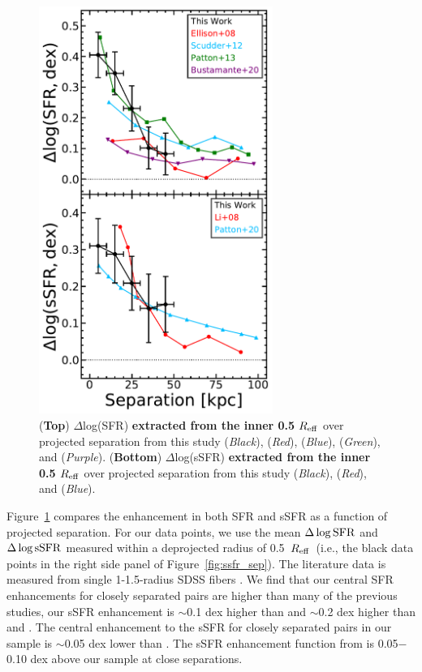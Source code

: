 \documentclass[iop,revtex4,twocolumn,apj,numberedappendix,appendixfloats]{emulateapj}
\newcommand{\reff}{$R_{\rm eff}$}
\begin{document}
\begin{figure}
\centering
\includegraphics[width=3in]{fig/nuc_sep.pdf}
\caption[]{(\textbf{Top}) $\Delta$log(SFR) \textbf{extracted from the inner 0.5 \reff} over projected separation from this study ({\it Black}), \citet{Ellison:2008} ({\it Red}), \citet{Scudder:2012} ({\it Blue}), \citet{Patton:2013} ({\it Green}), and \citet{Bustamante:2020} ({\it Purple}). (\textbf{Bottom}) $\Delta$log(sSFR) \textbf{extracted from the inner 0.5 \reff} over projected separation from this study ({\it Black}), \citet{Li:2008} ({\it Red}), and \citet{Patton:2020} ({\it Blue}).
}
\label{fig:nuc_sep}
\end{figure}

Figure~\ref{fig:nuc_sep} compares the enhancement in both SFR and sSFR as a function of projected separation. For our data points, we use the mean $\Delta\log{\rm SFR}$ and $\Delta\log{\rm sSFR}$ measured within a deprojected radius of 0.5~\reff\ (i.e., the black data points in the right side panel of Figure~\ref{fig:ssfr_sep}). The literature data is measured from single 1-1.5\arcsec-radius SDSS fibers \citep{Ellison:2008,Scudder:2012,Patton:2013,Bustamante:2020}. We find that our central SFR enhancements for closely separated pairs are higher than many of the previous studies, our sSFR enhancement is $\sim$0.1 dex higher than \citet{Scudder:2012} and $\sim$0.2 dex higher than \citet{Ellison:2008} and \citet{Bustamante:2020}. The central enhancement to the sSFR for closely separated pairs in our sample is $\sim$0.05 dex lower than \citet{Patton:2013}. The sSFR enhancement function from \citet{Li:2008} is 0.05$-$0.10 dex above our sample at close separations.   
\end{document}
